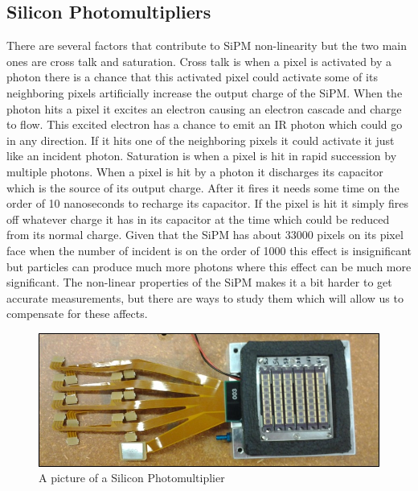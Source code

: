 \subsection{Silicon Photomultipliers}
There are several factors that contribute to SiPM non-linearity but the two main ones are cross talk and saturation. Cross talk is when a pixel is activated by a photon there is a chance that this activated pixel could activate some of its neighboring pixels artificially increase the output charge of the SiPM. When the photon hits a pixel it excites an electron causing an electron cascade and charge to flow. This excited electron has a chance to emit an IR photon which could go in any direction. If it hits one of the neighboring pixels it could activate it just like an incident photon. Saturation is when a pixel is hit in rapid succession by multiple photons. When a pixel is hit by a photon it discharges its capacitor which is the source of its output charge. After it fires it needs some time on the order of 10 nanoseconds to recharge its capacitor. If the pixel is hit it simply fires off whatever charge it has in its capacitor at the time which could be reduced from its normal charge. Given that the SiPM has about 33000 pixels on its pixel face when the number of incident is on the order of 1000 this effect is insignificant but particles can produce much more photons where this effect can be much more significant. The non-linear properties of the SiPM makes it a bit harder to get accurate measurements, but there are ways to study them which will allow us to compensate for these affects.

\begin{figure}
\centering
\includegraphics[width=\linewidth]{Figures/SiPM.jpg}
\caption{A picture of a Silicon Photomultiplier}
\label{fig:SiPM}
\end{figure}




